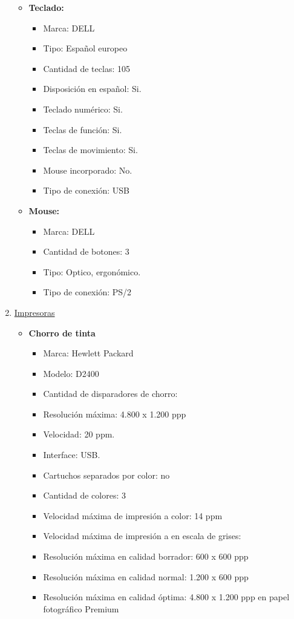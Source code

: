 \begin{enumerate}
\begin{itemize}
    \item \textbf{Teclado:}
    \begin{itemize}
      \item Marca: DELL
      \item Tipo: Español europeo
      \item Cantidad de teclas: 105
      \item Disposición en español: Si.
      \item Teclado numérico: Si.
      \item Teclas de función: Si.
      \item Teclas de movimiento: Si.
      \item Mouse incorporado: No.
      \item Tipo de conexión: USB
    \end{itemize}
    
    \item \textbf{Mouse:}
    \begin{itemize}
      \item Marca: DELL
      \item Cantidad de botones: 3
      \item Tipo: Optico, ergonómico.
      \item Tipo de conexión: PS/2
    \end{itemize}
  \end{itemize}
  
  \item \underline{Impresoras}
  \begin{itemize}
    \item \textbf{Chorro de tinta}
    \begin{itemize}
      \item Marca: Hewlett Packard
      \item Modelo: D2400
      \item Cantidad de disparadores de chorro: 
      
      \item Resolución máxima: 4.800 x 1.200 ppp
      \item Velocidad: 20 ppm.
      \item Interface: USB.
      
      \item Cartuchos separados por color: no
      \item Cantidad de colores: 3
      \item Velocidad máxima de impresión a color: 14 ppm
      \item Velocidad máxima de impresión a en escala de grises:
      \item Resolución máxima en calidad borrador: 600 x 600 ppp
      \item Resolución máxima en calidad normal: 1.200 x 600 ppp
      \item Resolución máxima en calidad óptima: 4.800 x 1.200 ppp en papel fotográfico Premium
      

\end{itemize}
\end{itemize}
\end{enumerate}
